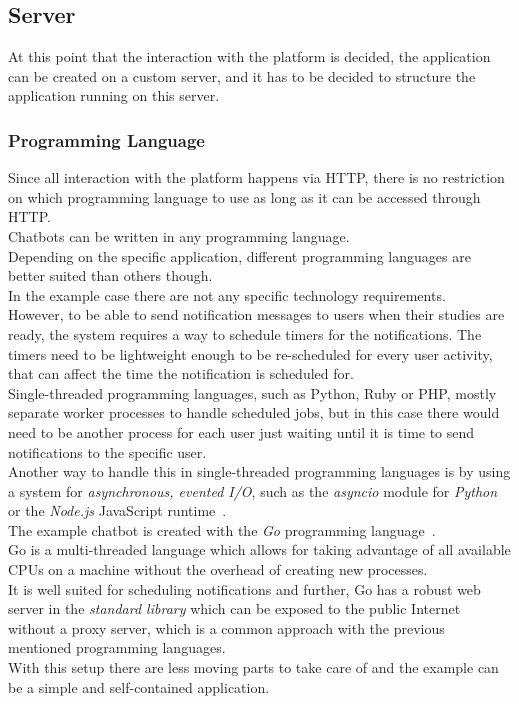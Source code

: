 \subsection{Server}

At this point that the interaction with the platform is decided, the application can be created on a custom server,
and it has to be decided to structure the application running on this server.


\subsubsection{Programming Language}

Since all interaction with the platform happens via HTTP,
there is no restriction on which programming language to use as long as it can be accessed through HTTP.
\\
Chatbots can be written in any programming language.
\\
Depending on the specific application, different programming languages are better suited than others though.
\\

In the example case there are not any specific technology requirements.
\\
However, to be able to send notification messages to users when their studies are ready,
the system requires a way to schedule timers for the notifications.
The timers need to be lightweight enough to be re-scheduled for every user activity,
that can affect the time the notification is scheduled for.
\\
Single-threaded programming languages, such as Python, Ruby or PHP,
mostly separate worker processes to handle scheduled jobs,
but in this case there would need to be another process for each user
just waiting until it is time to send notifications to the specific user.
\\
Another way to handle this in single-threaded programming languages is by using a system for \emph{asynchronous, evented I/O},
such as the \emph{asyncio} module for \emph{Python}~\cite{asyncio} or the \emph{Node.js} JavaScript runtime~\cite{nodejs}.
\\

The example chatbot is created with the \emph{Go} programming language~\cite{golang}.
\\
Go is a multi-threaded language which allows for taking advantage of all available CPUs
on a machine without the overhead of creating new processes.
\\
It is well suited for scheduling notifications and further, Go has a robust web server in the \emph{standard library} which can be exposed to the public Internet without a proxy server, which is a common approach with the previous mentioned programming languages.
\\
With this setup there are less moving parts to take care of and the example can be a simple and self-contained application.
\\



